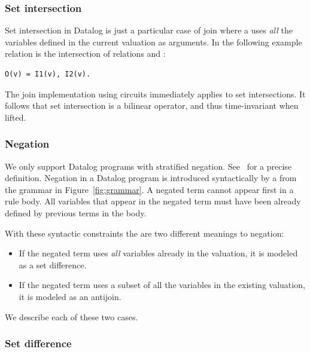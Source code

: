 \subsubsection{Set intersection}\label{sec:intersection}

Set intersection in Datalog is just a particular case of join where a 
uses \emph{all} the variables defined in the current valuation as arguments.
In the following example relation  is the 
intersection of relations  and :

\begin{lstlisting}[language=ddlog]
O(v) = I1(v), I2(v).
\end{lstlisting}

The join implementation using circuits immediately applies to set intersections.
It follows that set intersection is a bilinear operator, and thus time-invariant 
when lifted.

\subsubsection{Negation}\label{sec:negation}

We only support Datalog programs with stratified negation.  
See~\cite{Abiteboul-book95} for a precise definition.  
Negation in a Datalog program is introduced syntactically by a  
from the grammar in Figure~\ref{fig:grammar}.  A negated term
cannot appear first in a rule body.  All variables that
appear in the negated term must have been already defined
by previous terms in the body.  

With these syntactic constraints the are two different meanings to 
negation:

\begin{itemize}
    \item If the negated term uses \emph{all} variables already in the valuation, 
    it is modeled as a set difference.
    \item If the negated term uses a subset of all the variables in the
    existing valuation, it is modeled as an antijoin.
\end{itemize}

We describe each of these two cases.

\subsubsection{Set difference}\label{sec:set-difference}

